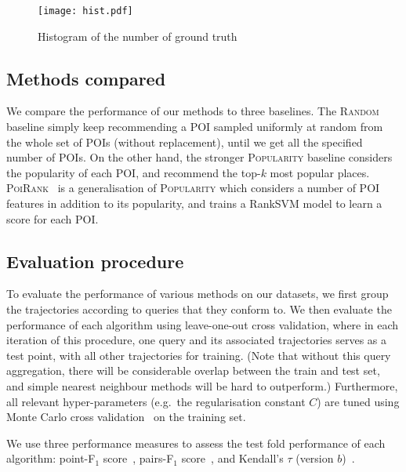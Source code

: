 \begin{figure*}[t]
	\centering
	\texttt{[image: hist.pdf]}
	\caption{Histogram of the number of ground truth}
	\label{fig:hist}
\end{figure*}


%
\subsection{Methods compared}

We compare the performance of our methods to three baselines.
The \textsc{Random} baseline simply keep recommending a POI sampled uniformly at random from the whole set of POIs (without replacement), until we get all the specified number of POIs.
On the other hand, the stronger \textsc{Popularity} baseline considers the popularity of each POI, 
and recommend the top-$k$ most popular places.
\textsc{PoiRank}~\cite{cikm16paper} is a generalisation of \textsc{Popularity} which considers a number of POI features in addition to its popularity,
and trains a RankSVM model to learn a score for each POI.



%
\subsection{Evaluation procedure}

To evaluate the performance of various methods on our datasets,
we first group the trajectories according to queries that they conform to.
We then evaluate the performance of each algorithm using leave-one-out cross validation,
where in each iteration of this procedure,
one query and its associated trajectories serves as a test point, with all other trajectories for training.
(Note that without this query aggregation, there will be considerable overlap between the train and test set, and simple nearest neighbour methods will be hard to outperform.)
Furthermore, 
all relevant hyper-parameters (e.g.\ the regularisation constant $C$) are tuned using Monte Carlo cross validation~\cite{burman1989comparative} on the training set.

We use three performance measures to assess the test fold performance of each algorithm:
point-F$_1$ score~\cite{ijcai15},
pairs-F$_1$ score~\cite{cikm16paper},
and
Kendall's $\tau$ (version $b$)~\cite{kendall1945,agresti2010analysis}.

